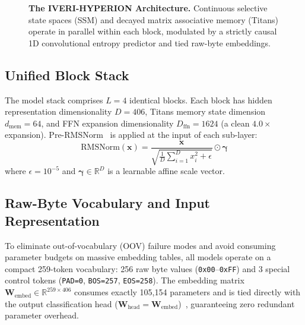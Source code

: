 \documentclass[10pt,twocolumn,letterpaper]{article}
\begin{document}
\begin{figure}[t]
\caption{\textbf{The IVERI-HYPERION Architecture.} Continuous selective state spaces (SSM) and decayed matrix associative memory (Titans) operate in parallel within each block, modulated by a strictly causal 1D convolutional entropy predictor and tied raw-byte embeddings.}
\label{fig:architecture}
\end{figure}

\subsection{Unified Block Stack}
The model stack comprises $L = 4$ identical blocks. Each block has hidden representation dimensionality $D = 406$, Titans memory state dimension $d_{\text{mem}} = 64$, and FFN expansion dimensionality $D_{\text{ffn}} = 1624$ (a clean $4.0\times$ expansion). Pre-RMSNorm~\cite{zhang2019rmsnorm} is applied at the input of each sub-layer:
\begin{equation}
    \text{RMSNorm}(\mathbf{x}) = \frac{\mathbf{x}}{\sqrt{\frac{1}{D}\sum_{i=1}^D x_i^2 + \epsilon}} \odot \boldsymbol{\gamma}
\end{equation}
where $\epsilon = 10^{-5}$ and $\boldsymbol{\gamma} \in \mathbb{R}^D$ is a learnable affine scale vector.

\subsection{Raw-Byte Vocabulary and Input Representation}
To eliminate out-of-vocabulary (OOV) failure modes and avoid consuming parameter budgets on massive embedding tables, all models operate on a compact 259-token vocabulary: 256 raw byte values (\texttt{0x00}--\texttt{0xFF}) and 3 special control tokens (\texttt{PAD=0}, \texttt{BOS=257}, \texttt{EOS=258}). The embedding matrix $\mathbf{W}_{\text{embed}} \in \mathbb{R}^{259 \times 406}$ consumes exactly 105,154 parameters and is tied directly with the output classification head ($\mathbf{W}_{\text{head}} = \mathbf{W}_{\text{embed}}$)~\cite{press2017tied}, guaranteeing zero redundant parameter overhead.
\end{document}
